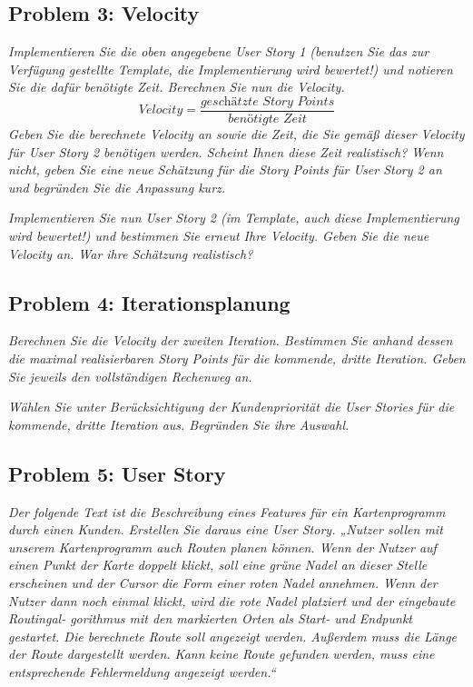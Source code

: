 \documentclass[
  ngerman,
  DIV=14
]{scrartcl}
\begin{document}
\subsection*{Problem 3: Velocity}
\emph{Implementieren Sie die oben angegebene User Story 1 (benutzen Sie das zur Verfügung gestellte Template, die Implementierung wird bewertet!) und notieren Sie die dafür benötigte Zeit. Berechnen Sie nun die Velocity.}
\begin{equation*}
\textit{Velocity} = \frac{\textit{geschätzte Story Points}}{\textit{benötigte Zeit}}  
\end{equation*}
\smallskip\noindent
\emph{Geben Sie die berechnete Velocity an sowie die Zeit, die Sie gemäß dieser Velocity für User Story 2 benötigen werden. Scheint Ihnen diese Zeit realistisch? Wenn nicht, geben Sie eine neue Schätzung für die Story Points für User Story 2 an und begründen Sie die Anpassung kurz.}

\medskip\noindent
\emph{Implementieren Sie nun User Story 2 (im Template, auch diese Implementierung wird bewertet!) und bestimmen Sie erneut Ihre Velocity. Geben Sie die neue Velocity an. War ihre Schätzung realistisch?}

\subsection*{Problem 4: Iterationsplanung}
\emph{Berechnen Sie die Velocity der zweiten Iteration.
Bestimmen Sie anhand dessen die maximal realisierbaren Story Points für die kommende, dritte Iteration. Geben Sie jeweils den vollständigen Rechenweg an.}

\medskip\noindent
\emph{Wählen Sie unter Berücksichtigung der Kundenpriorität die User Stories für die kommende, dritte Iteration aus. Begründen Sie ihre Auswahl.}

\subsection*{Problem 5: User Story}
\emph{Der folgende Text ist die Beschreibung eines Features für ein Kartenprogramm durch einen Kunden. Erstellen Sie daraus eine User Story.
„Nutzer sollen mit unserem Kartenprogramm auch Routen planen können. Wenn der Nutzer auf einen Punkt der Karte doppelt klickt, soll eine grüne Nadel an dieser Stelle erscheinen und der Cursor die Form einer roten Nadel annehmen. Wenn der Nutzer dann noch einmal klickt, wird die rote Nadel platziert und der eingebaute Routingal- gorithmus mit den markierten Orten als Start- und Endpunkt gestartet. Die berechnete Route soll angezeigt werden. Außerdem muss die Länge der Route dargestellt werden. Kann keine Route gefunden werden, muss eine entsprechende Fehlermeldung angezeigt werden.“}
\end{document}

